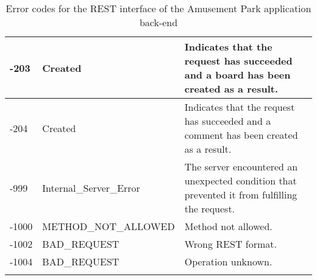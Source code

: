 \begin{longtable}{|p{}|p{} |p{}|}
-203  & Created                  & Indicates that the request has succeeded and a board has been created as a result. \\ \hline
-204  & Created                  & Indicates that the request has succeeded and a comment has been created as a result. \\ \hline
-999  & Internal\_Server\_Error  & The server encountered an unexpected condition that prevented it from fulfilling the request. \\ \hline
-1000 & METHOD\_NOT\_ALLOWED     & Method not allowed. \\ \hline
-1002 & BAD\_REQUEST             & Wrong REST format. \\ \hline
-1004 & BAD\_REQUEST             & Operation unknown. \\ \hline

\caption{Error codes for the REST interface of the Amusement Park application back-end}
\label{tab:termGlossary}
\end{longtable}